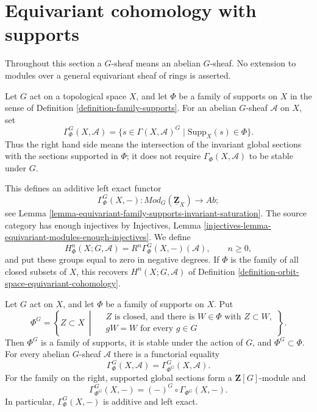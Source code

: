 \section{Equivariant cohomology with supports}
\label{section-equivariant-cohomology-supports}

\noindent
Throughout this section a $G$-sheaf means an abelian $G$-sheaf. No extension
to modules over a general equivariant sheaf of rings is asserted.

\begin{definition}
\label{definition-equivariant-cohomology-family-supports}
\begin{reference}
\cite[Chapter V, \S 5.7, p. 219]{Tohoku}
\end{reference}
Let $G$ act on a topological space $X$, and let $\Phi$ be a family of
supports on $X$ in the sense of Definition
\ref{definition-family-supports}. For an abelian $G$-sheaf $\mathcal A$ on
$X$, set
$$
\Gamma^G_\Phi(X,\mathcal A)
=
\{s\in\Gamma(X,\mathcal A)^G\mid
\text{Supp}_X(s)\in\Phi\}.
$$
Thus the right hand side means the intersection of the invariant global
sections with the sections supported in $\Phi$; it does not require
$\Gamma_\Phi(X,\mathcal A)$ to be stable under $G$.

This defines an additive left exact functor
$$
\Gamma^G_\Phi(X,-):
\textit{Mod}_G(\underline{\mathbf Z}_X)
\longrightarrow
\textit{Ab};
$$
see Lemma \ref{lemma-equivariant-family-supports-invariant-saturation}.
The source category has enough injectives by Injectives, Lemma
\ref{injectives-lemma-equivariant-modules-enough-injectives}. We define
$$
H^n_\Phi(X;G,\mathcal A)
=
R^n\Gamma^G_\Phi(X,-)(\mathcal A),
\qquad n\geq 0,
$$
and put these groups equal to zero in negative degrees. If $\Phi$ is the
family of all closed subsets of $X$, this recovers
$H^n(X;G,\mathcal A)$ of Definition
\ref{definition-orbit-space-equivariant-cohomology}.
\end{definition}

\begin{lemma}
\label{lemma-equivariant-family-supports-invariant-saturation}
\begin{reference}
\cite[Chapter V, \S 5.7, p. 219]{Tohoku}
\end{reference}
Let $G$ act on $X$, and let $\Phi$ be a family of supports on $X$. Put
$$
\Phi^G=
\left\{
Z\subset X\ \middle|\
\begin{aligned}
&Z\text{ is closed, and there is }W\in\Phi\text{ with }Z\subset W,\\
&gW=W\text{ for every }g\in G
\end{aligned}
\right\}.
$$
Then $\Phi^G$ is a family of supports, it is stable under the action of
$G$, and $\Phi^G\subset\Phi$. For every abelian $G$-sheaf $\mathcal A$
there is a functorial equality
$$
\Gamma^G_\Phi(X,\mathcal A)
=
\Gamma^G_{\Phi^G}(X,\mathcal A).
$$
For the family on the right, supported global sections form a
$\mathbf Z[G]$-module and
$$
\Gamma^G_{\Phi^G}(X,-)
=
(-)^G\circ\Gamma_{\Phi^G}(X,-).
$$
In particular, $\Gamma^G_\Phi(X,-)$ is additive and left exact.
\end{lemma}

